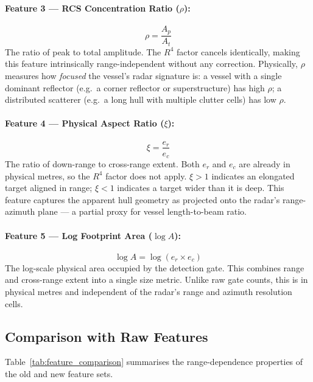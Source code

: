 \documentclass[journal]{IEEEtran}
\begin{document}
\paragraph{Feature 3 — RCS Concentration Ratio ($\rho$):}
\begin{equation}
  \rho = \frac{A_p}{A_t}
  \label{eq:rcs_conc}
\end{equation}
The ratio of peak to total amplitude. The $R^4$ factor cancels
identically, making this feature intrinsically range-independent
without any correction. Physically, $\rho$ measures how \emph{focused}
the vessel's radar signature is: a vessel with a single dominant
reflector (e.g.\ a corner reflector or superstructure) has high $\rho$;
a distributed scatterer (e.g.\ a long hull with multiple clutter
cells) has low $\rho$.

\paragraph{Feature 4 — Physical Aspect Ratio ($\xi$):}
\begin{equation}
  \xi = \frac{e_r}{e_c}
  \label{eq:aspect}
\end{equation}
The ratio of down-range to cross-range extent. Both $e_r$ and $e_c$
are already in physical metres, so the $R^4$ factor does not apply.
$\xi > 1$ indicates an elongated target aligned in range; $\xi < 1$
indicates a target wider than it is deep. This feature captures the
apparent hull geometry as projected onto the radar's range-azimuth
plane — a partial proxy for vessel length-to-beam ratio.

\paragraph{Feature 5 — Log Footprint Area ($\log A$):}
\begin{equation}
  \log A = \log(e_r \times e_c)
  \label{eq:footprint}
\end{equation}
The log-scale physical area occupied by the detection gate. This
combines range and cross-range extent into a single size metric. Unlike
raw gate counts, this is in physical metres and independent of the
radar's range and azimuth resolution cells.

\subsection{Comparison with Raw Features}

Table~\ref{tab:feature_comparison} summarises the range-dependence
properties of the old and new feature sets.
\end{document}
